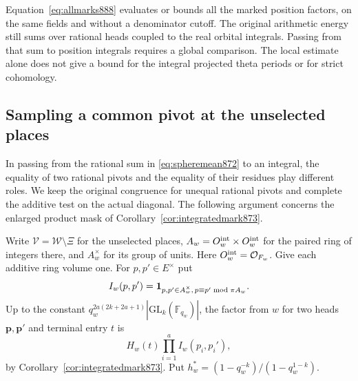 \documentclass[a4paper,11pt]{article}
\theoremstyle{definition}
\theoremstyle{remark}
\numberwithin{equation}{section}
\begin{document}
Equation~\eqref{eq:allmarks888} evaluates or bounds all the
marked position factors, on the same fields and without a
denominator cutoff. The original arithmetic energy still sums
over rational heads coupled to the real orbital integrals.
Passing from that sum to position integrals requires a global
comparison. The local estimate alone does not give a bound
for the integral projected theta periods or for strict cohomology.
\clearpage

\subsection{Sampling a common pivot at the unselected places}
\label{sec:commoncompletion889}

In passing from the rational sum in \eqref{eq:spheremean872} to
an integral, the equality of two rational pivots and the equality
of their residues play different roles. We keep the original
congruence for unequal rational pivots and complete the additive
test on the actual diagonal. The following argument concerns the
enlarged product mask of Corollary~\ref{cor:integratedmark873}.

Write \(\mathcal V=\mathcal W\setminus\Xi\) for the unselected
places, \(A_w=O_w^{\rm int}\times O_w^{\rm int}\) for the paired
ring of integers there, and \(A_w^\times\) for its group of units.
Here \(O_w^{\rm int}=\mathcal O_{F_w}\). Give each additive ring
volume one. For \(p,p'\in E^\times\) put
\[
 I_w(p,p')={\bf1}_{p,p'\in A_w^\times,\,
                       p\equiv p'\bmod\pi A_w}.
\]
Up to the constant \(q_w^{2a(2k+2a+1)}
|\mathrm{GL}_k(\mathbb F_{q_w})|\), the factor from \(w\) for
two heads \(\mathbf p,\mathbf p'\) and terminal entry \(t\) is
\[
               H_w(t)\prod_{i=1}^a I_w(p_i,p_i'),
\]
by Corollary~\ref{cor:integratedmark873}. Put
\(h_w^*=(1-q_w^{-k})/(1-q_w^{1-k})\).
\end{document}
